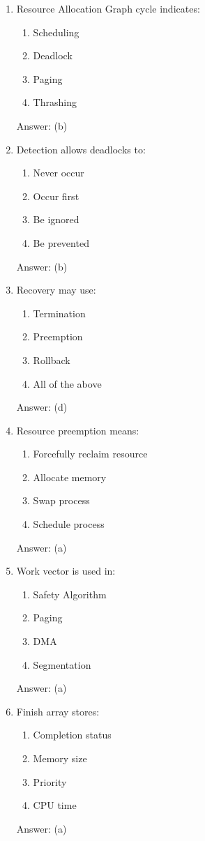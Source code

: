 \begin{enumerate}
\item Resource Allocation Graph cycle indicates:
\begin{enumerate}[label=(\alph*)]
\item Scheduling
\item Deadlock
\item Paging
\item Thrashing
\end{enumerate}
Answer: (b)

\item Detection allows deadlocks to:
\begin{enumerate}[label=(\alph*)]
\item Never occur
\item Occur first
\item Be ignored
\item Be prevented
\end{enumerate}
Answer: (b)

\item Recovery may use:
\begin{enumerate}[label=(\alph*)]
\item Termination
\item Preemption
\item Rollback
\item All of the above
\end{enumerate}
Answer: (d)

\item Resource preemption means:
\begin{enumerate}[label=(\alph*)]
\item Forcefully reclaim resource
\item Allocate memory
\item Swap process
\item Schedule process
\end{enumerate}
Answer: (a)

\item Work vector is used in:
\begin{enumerate}[label=(\alph*)]
\item Safety Algorithm
\item Paging
\item DMA
\item Segmentation
\end{enumerate}
Answer: (a)

\item Finish array stores:
\begin{enumerate}[label=(\alph*)]
\item Completion status
\item Memory size
\item Priority
\item CPU time
\end{enumerate}
Answer: (a)


\end{enumerate}
